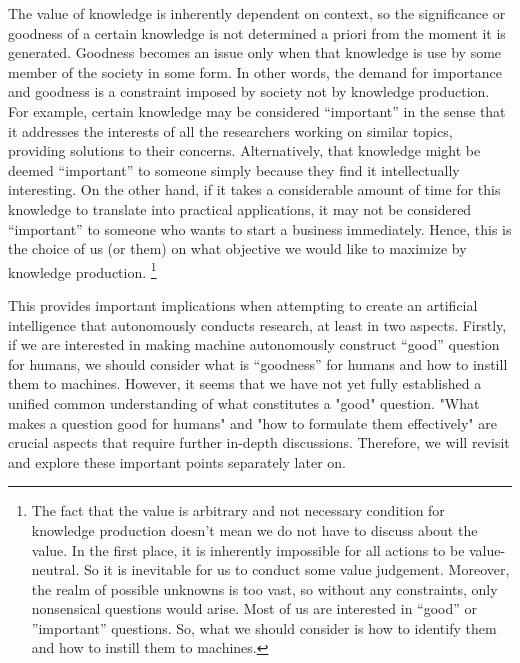 \documentclass{book}
\begin{document}
The value of knowledge is inherently dependent on context, so the significance or goodness of a certain knowledge is not determined a priori from the moment it is generated. Goodness becomes an issue only when that knowledge is use by some member of the society in some form. In other words, the demand for importance and goodness is a constraint imposed by society not by knowledge production. For example, certain knowledge may be considered ``important'' in the sense that it addresses the interests of all the researchers working on similar topics, providing solutions to their concerns. Alternatively, that knowledge might be deemed ``important'' to someone simply because they find it intellectually interesting. On the other hand, if it takes a considerable amount of time for this knowledge to translate into practical applications, it may not be considered ``important'' to someone who wants to start a business immediately. Hence, this is the choice of us (or them) on what objective we would like to maximize by knowledge production. \footnote{
The fact that the value is arbitrary and not necessary condition for knowledge production doesn't mean we do not have to discuss about the value. In the first place, it is inherently impossible for all actions to be value-neutral. So it is inevitable for us to conduct some value judgement. Moreover, the realm of possible unknowns is too vast, so without any constraints, only nonsensical questions would arise. Most of us are interested in ``good'' or ''important'' questions. So, what we should consider is how to identify them and how to instill them to machines.
}

This provides important implications when attempting to create an artificial intelligence that autonomously conducts research, at least in two aspects. Firstly, if we are interested in making machine autonomously construct ``good'' question for humans, we should consider what is ``goodness'' for humans and how to instill them to machines. However, it seems that we have not yet fully established a unified common understanding of what constitutes a "good" question. "What makes a question good for humans" and "how to formulate them effectively" are crucial aspects that require further in-depth discussions. Therefore, we will revisit and explore these important points separately later on.

\end{document}
